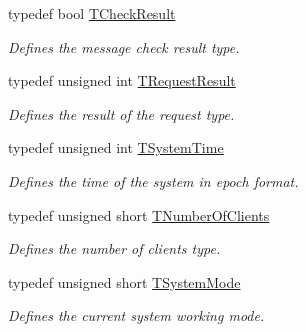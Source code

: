 \begin{DoxyCompactItemize}
typedef bool \hyperlink{class_terra_swarm_1_1_synchronous_1_1_client_connection_response_a33254e9e1216ca2dde89b8a66f7ad18e}{T\-Check\-Result}
\begin{DoxyCompactList}\small\item\em Defines the message check result type. \end{DoxyCompactList}\item 
typedef unsigned int \hyperlink{class_terra_swarm_1_1_synchronous_1_1_client_connection_response_a4b55c1f852e288564e5aa00e882f80d5}{T\-Request\-Result}
\begin{DoxyCompactList}\small\item\em Defines the result of the request type. \end{DoxyCompactList}\item 
typedef unsigned int \hyperlink{class_terra_swarm_1_1_synchronous_1_1_client_connection_response_a7b389f7e89631ce7c758c3a26c46c303}{T\-System\-Time}
\begin{DoxyCompactList}\small\item\em Defines the time of the system in epoch format. \end{DoxyCompactList}\item 
typedef unsigned short \hyperlink{class_terra_swarm_1_1_synchronous_1_1_client_connection_response_adc391c9557f0acfdb0763043058cdf83}{T\-Number\-Of\-Clients}
\begin{DoxyCompactList}\small\item\em Defines the number of clients type. \end{DoxyCompactList}\item 
typedef unsigned short \hyperlink{class_terra_swarm_1_1_synchronous_1_1_client_connection_response_a828bc4f350b4f661c541d988c79f05e9}{T\-System\-Mode}
\begin{DoxyCompactList}\small\item\em Defines the current system working mode. \end{DoxyCompactList}\end{DoxyCompactItemize}
